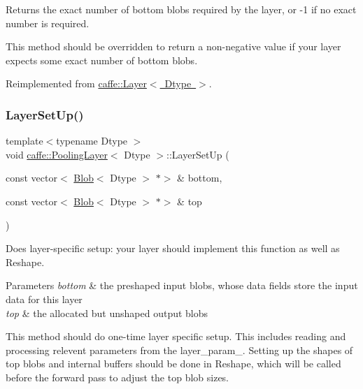 Returns the exact number of bottom blobs required by the layer, or -\/1 if no exact number is required. 

This method should be overridden to return a non-\/negative value if your layer expects some exact number of bottom blobs. 

Reimplemented from \mbox{\hyperlink{classcaffe_1_1_layer_a8e5ee0494d85f5f55fc4396537cbc60f}{caffe\+::\+Layer$<$ Dtype $>$}}.

\mbox{\label{classcaffe_1_1_pooling_layer_aa310fbe7d766ac96a1957aca6a3c4469}} 
\subsubsection{\texorpdfstring{Layer\+Set\+Up()}{LayerSetUp()}\hspace{0.1cm}{\footnotesize\ttfamily [1/2]}}
{\footnotesize\ttfamily template$<$typename Dtype $>$ \\
void \mbox{\hyperlink{classcaffe_1_1_pooling_layer}{caffe\+::\+Pooling\+Layer}}$<$ Dtype $>$\+::Layer\+Set\+Up (\begin{DoxyParamCaption}\item[{const vector$<$ \mbox{\hyperlink{classcaffe_1_1_blob}{Blob}}$<$ Dtype $>$ $\ast$$>$ \&}]{bottom,  }\item[{const vector$<$ \mbox{\hyperlink{classcaffe_1_1_blob}{Blob}}$<$ Dtype $>$ $\ast$$>$ \&}]{top }\end{DoxyParamCaption})\hspace{0.3cm}{\ttfamily [virtual]}}



Does layer-\/specific setup\+: your layer should implement this function as well as Reshape. 


\begin{DoxyParams}{Parameters}
{\em bottom} & the preshaped input blobs, whose data fields store the input data for this layer \\
\hline
{\em top} & the allocated but unshaped output blobs\\
\hline
\end{DoxyParams}
This method should do one-\/time layer specific setup. This includes reading and processing relevent parameters from the {\ttfamily layer\+\_\+param\+\_\+}. Setting up the shapes of top blobs and internal buffers should be done in {\ttfamily Reshape}, which will be called before the forward pass to adjust the top blob sizes. 

